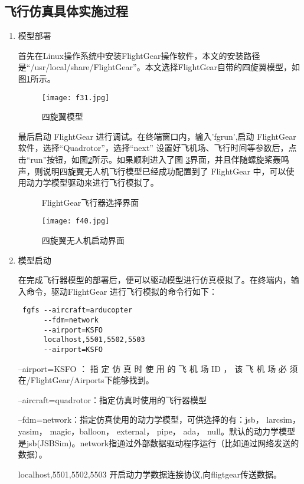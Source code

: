 \subsection{飞行仿真具体实施过程}
\begin{enumerate}
  \item  模型部署

  首先在Linux操作系统中安装FlightGear操作软件，本文的安装路径是“/usr/local/share/FlightGear”。本文选择FlightGear自带的四旋翼模型，如图\ref{fig28}所示。
  \begin{figure}[!ht]
\centering
\texttt{[image: f31.jpg]}
\caption{四旋翼模型}
\label{fig28}
\end{figure}

最后启动 FlightGear 进行调试。在终端窗口内，输入'fgrun',启动 FlightGear 软件，选择“Quadrotor”，选择“next” 设置好飞机场、飞行时间等参数后，点击“run”按钮，如图\ref{fig29}所示。如果顺利进入了图 \ref{fig30}界面，并且伴随螺旋桨轰鸣声，则说明四旋翼无人机飞行模型已经成功配置到了 FlightGear 中，可以使用动力学模型驱动来进行飞行模拟了。
  \begin{figure}[!ht]
\centering
{}
\caption{\label{fig29}FlightGear飞行器选择界面}
\end{figure}
\begin{figure}[!ht]
\centering
\texttt{[image: f40.jpg]}
\caption{四旋翼无人机启动界面}
\label{fig30}
\end{figure}
  \item 模型启动

  在完成飞行器模型的部署后，便可以驱动模型进行仿真模拟了。在终端内，输入命令，驱动FlightGear 进行飞行模拟的命令行如下：
\begin{lstlisting}
 fgfs --aircraft=arducopter
      --fdm=network
      --airport=KSFO
      localhost,5501,5502,5503
      --airport=KSFO
 \end{lstlisting}
 --airport=KSFO ： 指 定 仿 真 时 使 用 的 飞 机 场 ID ， 该 飞 机 场 必 须 在/FlightGear/Airports下能够找到。

 --aircraft=quadrotor：指定仿真时使用的飞行器模型

 --fdm=network：指定仿真使用的动力学模型，可供选择的有：jsb，  larcsim，yasim，  magic，balloon，  external，  pipe， ada，  null。默认的动力学模型是jsb(JSBSim)。network指通过外部数据驱动程序运行（比如通过网络发送的数据）。

  localhost,5501,5502,5503 开启动力学数据连接协议,向fligtgear传送数据。
\end{enumerate}
